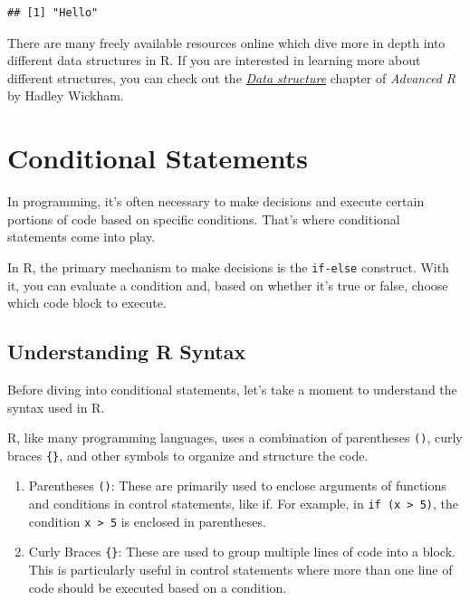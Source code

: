 \documentclass[
]{book}
\begin{document}
\begin{verbatim}
## [1] "Hello"
\end{verbatim}

There are many freely available resources online which dive more in depth into different data structures in R. If you are interested in learning more about different structures, you can check out the \href{http://adv-r.had.co.nz/Data-structures.html}{\emph{Data structure}} chapter of \emph{Advanced R} by Hadley Wickham.

\hypertarget{conditional-statements}{%
\section{Conditional Statements}\label{conditional-statements}}

In programming, it's often necessary to make decisions and execute certain portions of code based on specific conditions. That's where conditional statements come into play.

In R, the primary mechanism to make decisions is the \texttt{if-else} construct. With it, you can evaluate a condition and, based on whether it's true or false, choose which code block to execute.

\hypertarget{understanding-r-syntax}{%
\subsection{Understanding R Syntax}\label{understanding-r-syntax}}

Before diving into conditional statements, let's take a moment to understand the syntax used in R.

R, like many programming languages, uses a combination of parentheses \texttt{()}, curly braces \texttt{\{\}}, and other symbols to organize and structure the code.

\begin{enumerate}
\def\labelenumi{\arabic{enumi}.}
\item
  Parentheses \texttt{()}: These are primarily used to enclose arguments of functions and conditions in control statements, like if. For example, in \texttt{if\ (x\ \textgreater{}\ 5)}, the condition \texttt{x\ \textgreater{}\ 5} is enclosed in parentheses.
\item
  Curly Braces \texttt{\{\}}: These are used to group multiple lines of code into a block. This is particularly useful in control statements where more than one line of code should be executed based on a condition.
\end{enumerate}
\end{document}
